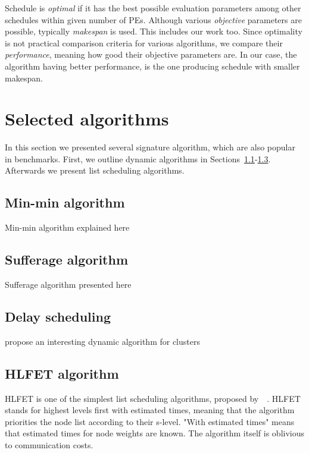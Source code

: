 Schedule is \emph{optimal} if it has the best possible evaluation
parameters among other schedules within given number of PEs. Although
various \emph{objective} parameters are possible, typically
\emph{makespan} is used. This includes our work too. Since optimality
is not practical comparison criteria for various algorithms, we
compare their \emph{performance}, meaning how good their objective
parameters are. In our case, the algorithm having better performance,
is the one producing schedule with smaller makespan.

\section{Selected algorithms}
\label{sec:selected}

In this section we presented several signature algorithm, which are
also popular in benchmarks. First, we outline dynamic algorithms in
Sections~\ref{sec:min_min}-\ref{sec:delay_sched}. Afterwards we
present list scheduling algorithms.

\subsection{Min-min algorithm}
\label{sec:min_min}

Min-min algorithm explained here~\cite{maheswaran1999dynamic}

\subsection{Sufferage algorithm}
\label{sec:sufferage}

Sufferage algorithm presented here~\cite{maheswaran1999dynamic}

\subsection{Delay scheduling}
\label{sec:delay_sched}

\cite{zaharia2010delay} propose an interesting dynamic algorithm for clusters

\subsection{HLFET algorithm}
\label{sec:hlfet}

HLFET is one of the simplest list scheduling algorithms, proposed
by~\citeauthor{adam1974}~\cite{adam1974}. HLFET stands for highest
levels first with estimated times, meaning that the algorithm
priorities the node list according to their s-level. "With estimated
times" means that estimated times for node weights are known. The
algorithm itself is oblivious to communication costs.

